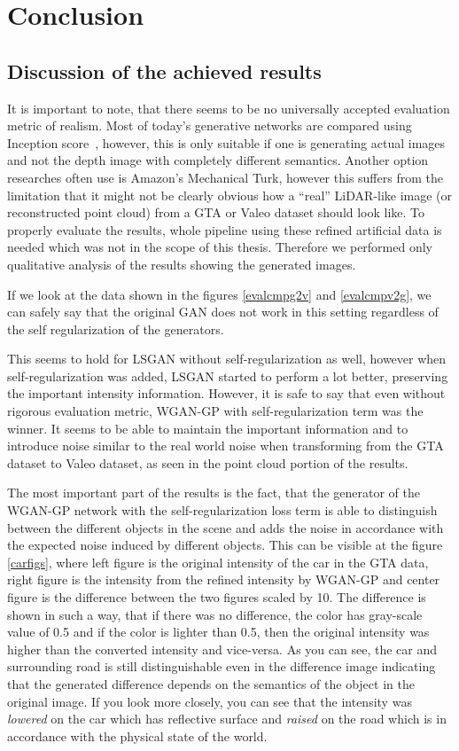 \chapter{Conclusion}

\section{Discussion of the achieved results}

It is important to note, that there seems to be no universally accepted evaluation metric of realism. Most of today's generative networks are compared using Inception score~\cite{inception}, however, this is only suitable if one is generating actual images and not the depth image with completely different semantics. Another option researches often use is Amazon's Mechanical Turk, however this suffers from the limitation that it might not be clearly obvious how a ``real'' LiDAR-like image (or reconstructed point cloud) from a GTA or Valeo dataset should look like. To properly evaluate the results, whole pipeline using these refined artificial data is needed which was not in the scope of this thesis. Therefore we performed only qualitative analysis of the results showing the generated images.

If we look at the data shown in the figures \ref{evalcmpg2v} and \ref{evalcmpv2g}, we can safely say that the original GAN does not work in this setting regardless of the self regularization of the generators.

This seems to hold for LSGAN without self-regularization as well, however when self-regularization was added, LSGAN started to perform a lot better, preserving the important intensity information. However, it is safe to say that even without rigorous evaluation metric, WGAN-GP with self-regularization term was the winner. It seems to be able to maintain the important information and to introduce noise similar to the real world noise when transforming from the GTA dataset to Valeo dataset, as seen in the point cloud portion of the results.

The most important part of the results is the fact, that the generator of the WGAN-GP network with the self-regularization loss term is able to distinguish between the different objects in the scene and adds the noise in accordance with the expected noise induced by different objects. This can be visible at the figure \ref{carfigs}, where left figure is the original intensity of the car in the GTA data, right figure is the intensity from the refined intensity by WGAN-GP and center figure is the difference between the two figures scaled by 10. The difference is shown in such a way, that if there was no difference, the color has gray-scale value of 0.5 and if the color is lighter than 0.5, then the original intensity was higher than the converted intensity and vice-versa. As you can see, the car and surrounding road is still distinguishable even in the difference image indicating that the generated difference depends on the semantics of the object in the original image. If you look more closely, you can see that the intensity was {\em lowered} on the car which has reflective surface and {\em raised} on the road which is in accordance with the physical state of the world.

